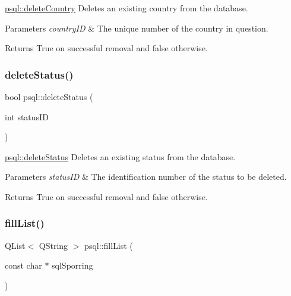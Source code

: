 \hyperlink{classpsql_a914bf8701fbed4ff80edcd0d09c7c3fd}{psql\+::delete\+Country} Deletes an existing country from the database. 


\begin{DoxyParams}{Parameters}
{\em country\+ID} & The unique number of the country in question. \\
\hline
\end{DoxyParams}
\begin{DoxyReturn}{Returns}
True on successful removal and false otherwise. 
\end{DoxyReturn}
\mbox{\label{classpsql_a26fc592cfb9f484e1bee62af527f2b95}} 
\subsubsection{\texorpdfstring{delete\+Status()}{deleteStatus()}}
{\footnotesize\ttfamily bool psql\+::delete\+Status (\begin{DoxyParamCaption}\item[{int}]{status\+ID }\end{DoxyParamCaption})}



\hyperlink{classpsql_a26fc592cfb9f484e1bee62af527f2b95}{psql\+::delete\+Status} Deletes an existing status from the database. 


\begin{DoxyParams}{Parameters}
{\em status\+ID} & The identification number of the status to be deleted. \\
\hline
\end{DoxyParams}
\begin{DoxyReturn}{Returns}
True on successful removal and false otherwise. 
\end{DoxyReturn}
\mbox{\label{classpsql_a2ad41caea89dc5af0b55b12f6394fbf5}} 
\subsubsection{\texorpdfstring{fill\+List()}{fillList()}}
{\footnotesize\ttfamily Q\+List$<$ Q\+String $>$ psql\+::fill\+List (\begin{DoxyParamCaption}\item[{const char $\ast$}]{sql\+Sporring }\end{DoxyParamCaption})}



